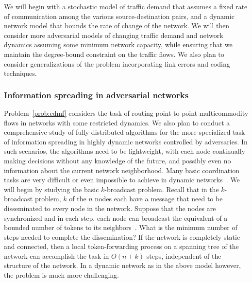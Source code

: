 
We will begin with a stochastic model of traffic demand that assumes a
fixed rate of communication among the various source-destination
pairs, and a dynamic network model that bounds the rate of change of
the network.  We will then consider more adversarial models of
changing traffic demand and network dynamics assuming some minimum
network capacity, while ensuring that we maintain the degree-bound
constraint on the traffic flows.  We also plan to consider
generalizations of the problem incorporating link errors and coding
techniques.



\subsubsection{Information spreading in adversarial networks}
Problem~\ref{prob:cdmf} considers the task of routing point-to-point
multicommodity flows in networks with some restricted dynamics.  We
also plan to conduct a comprehensive study of fully distributed
algorithms for the more specialized task of information spreading in
highly dynamic networks controlled by adversaries.  In such scenarios,
the algorithms need to be lightweight, with each node continually
making decisions without any knowledge of the future, and possibly
even no information about the current network neighborhood.  Many
basic coordination tasks are very difficult or even impossible to
achieve in dynamic networks~\cite{fich+r:impossibility}.  We will
begin by studying the basic $k$-broadcast problem.  Recall that in the
$k$-broadcast problem, $k$ of the $n$ nodes each have a message that
need to be disseminated to every node in the network.  Suppose that
the nodes are synchronized and in each step, each node can broadcast
the equivalent of a bounded number of tokens to its
neighbors~\cite{kuhn+lo:dynamic}.  What is the minimum number of steps
needed to complete the dissemination?  If the network is completely
static and connected, then a local token-forwarding process on a
spanning tree of the network can accomplish the task in $O(n + k)$
steps, independent of the structure of the network.  In a dynamic
network as in the above model however, the problem is much more
challenging.

